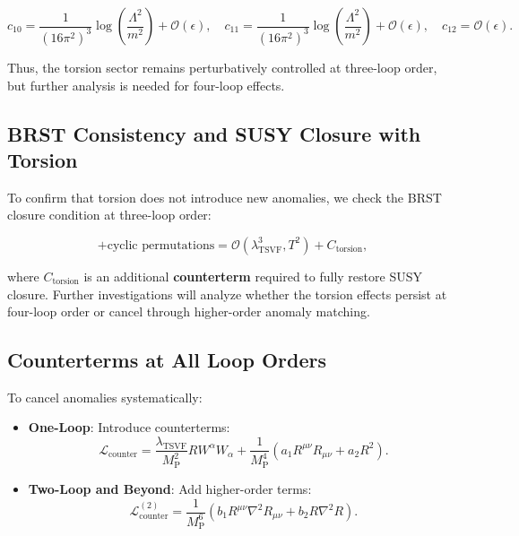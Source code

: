 \documentclass[12pt, onecolumn]{article}
\theoremstyle{definition}
\newcommand{\tsvf}{\lambda_{\mathrm{TSVF}}}
\newcommand{\Mp}{M_{\mathrm{P}}}
\numberwithin{equation}{section}
\begin{document}
\begin{equation}
    c_{10} = \frac{1}{(16\pi^2)^3} \log \left( \frac{\Lambda^2}{m^2} \right) + \mathcal{O}(\epsilon),
    \quad c_{11} = \frac{1}{(16\pi^2)^3} \log \left( \frac{\Lambda^2}{m^2} \right) + \mathcal{O}(\epsilon),
    \quad c_{12} = \mathcal{O}(\epsilon).
    \label{eq:torsion-divergences}
\end{equation}

Thus, the torsion sector remains perturbatively controlled at three-loop order, but further analysis is needed for four-loop effects.

\subsection{BRST Consistency and SUSY Closure with Torsion}
\label{subsec:brst-closure-torsion}

To confirm that torsion does not introduce new anomalies, we check the BRST closure condition at three-loop order:

\begin{equation}
    [Q_\alpha, \{Q_\beta, \bar{Q}_{\dot{\alpha}}\}] + \text{cyclic permutations} = \mathcal{O}(\lambda_{\text{TSVF}}^3, T^2) + C_{\mathrm{torsion}},
    \label{eq:three-loop-torsion-jacobi}
\end{equation}

where \( C_{\mathrm{torsion}} \) is an additional \textbf{counterterm} required to fully restore SUSY closure. Further investigations will analyze whether the torsion effects persist at four-loop order or cancel through higher-order anomaly matching.



\subsection{Counterterms at All Loop Orders}
To cancel anomalies systematically:
\begin{itemize}
\item \textbf{One-Loop}: Introduce counterterms:
\begin{equation}
\mathcal{L}_{\text{counter}} = \frac{\tsvf}{\Mp^2} R W^\alpha W_\alpha + \frac{1}{\Mp^4} \left(a_1 R^{\mu\nu} R_{\mu\nu} + a_2 R^2 \right).
\end{equation}

\item \textbf{Two-Loop and Beyond}: Add higher-order terms:
\begin{equation}
\mathcal{L}_{\text{counter}}^{(2)} = \frac{1}{\Mp^6} \left(b_1 R^{\mu\nu} \nabla^2 R_{\mu\nu} + b_2 R \nabla^2 R \right).
\end{equation}
\end{itemize}
\end{document}
